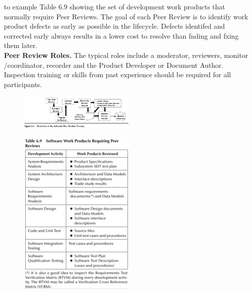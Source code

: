 \documentclass[twocolumn,a4paper,13pt]{book}
\begin{document}
to example Table 6.9 showing the set of development work
products that normally require Peer Reviews. The goal of
each Peer Review is to identify work product defects as early
as possible in the lifecycle. Defects identifed and corrected
early always results in a lower cost to resolve than fnding and
fxing them later.\\
\textbf{Peer Review Roles.} The typical roles include a moderator, reviewers, monitor /coordinator, recorder and the Product
Developer or Document Author. Inspection training or skills from past experience should be required for all participants. 
\begin{figure}[h!]
\includegraphics[width=0.5\textwidth]{p3}
\end{figure} 
\begin{figure}[h!]
	\includegraphics[width=0.5\textwidth]{last}
\end{figure} 
 
\end{document}
